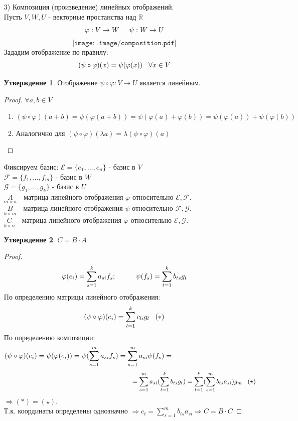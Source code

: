 \documentclass[a4paper, 12pt]{article}
\newcommand{\R}{\mathbb R}
\renewcommand{\phi}{\varphi}
\newcommand\tab[1][.5cm]{\hspace*{#1}}
\theoremstyle{definition}
\newtheorem*{subtheorem}{Утверждение}
\begin{document}
\begin{itemize}
\begin{proof}
    \end{proof} 
    \item[3)] Композиция (произведение) линейных отображений. \\
    Пусть $V, W, U$ - векторные простанства над $\R$
    $$\phi: V \to W \tab[0.5cm] \psi: W \to U$$
    $$\texttt{[image: .image/composition.pdf]}$$
    Зададим отображение по правилу: 
    $$(\psi \circ \phi)(x) = \psi(\phi(x)) \tab[0.3cm] \forall x \in V$$   
    \begin{subtheorem}
      Отображение $\psi \circ \phi: V \to U$ является линейным.
    \end{subtheorem} 
    \begin{proof}
      $\forall a, b \in V$
      \begin{enumerate}
        \item $(\psi \circ \phi)(a+b) = \psi(\phi(a+b)) = \psi(\phi(a)+\phi(b)) = \psi(\phi(a))+\psi(\phi(b))$ 
        \item Аналогично для $(\psi \circ \phi)(\lambda a) = \lambda(\psi \circ \phi)(a)$ 
      \end{enumerate}
    \end{proof} 

    Фиксируем базис: \tab[0.3cm]$\mathcal{E} = \{e_1,...,e_n\}$ - базис в $V$ \\
    \tab[4.3cm]$\mathcal{F} = \{f_1,...,f_m\}$ - базис в $W$ \\
    \tab[4.3cm]$\mathcal{G} = \{g_1,...,g_k\}$ - базис в $U$ \\
    $\underset{m \times n}{A}$ - матрица линейного отображения $\phi$ относительно $\mathcal{E}, \mathcal{F}$. \\
    $\underset{k \times m}{B}$ - матрица линейного отображения $\psi$ относительно $\mathcal{F}, \mathcal{G}$. \\
    $\underset{k \times n}{C}$ - матрица линейного отображения $\phi$ относительно $\mathcal{E}, \mathcal{G}$.
    \begin{subtheorem}
      $C = B \cdot A$ 
    \end{subtheorem} 
    \begin{proof}
      $$\phi(e_i) = \sum \limits_{s=1}^ka_{si}f_s; \tab[1cm]\psi(f_s) = \sum \limits_{t=1}^kb_{ts}g_t$$
      По определению матрицы линейного отображения:
      $$(\psi \circ \phi)(e_i) = \sum \limits_{l=1}^kc_{li}g_l \tab[0.3cm](\ast)$$ 
      По определению композиции:
      $$(\psi \circ \phi)(e_i) = \psi(\phi(e_i)) = \psi(\sum \limits_{s=1}^ma_{si}f_s) = \sum \limits_{s=1}^ma_{si}\psi(f_s) =\tab[4cm]$$ $$\tab[7cm]= \sum \limits_{s=1}^ma_{si}(\sum \limits_{t=1}^kb_{ts}g_t) = \sum \limits_{t=1}^k(\sum \limits_{s=1}^mb_{ts}a_{si})g_m \tab[0.3cm](\star)$$
      $\Longrightarrow $$(\ast) = (\star)$.\\
      Т.к. координаты определены однозначно $\Rightarrow c_t = \sum \limits_{s=1}^mb_{ts}a_{si} \Rightarrow C =B \cdot C$  
    \end{proof} 
  \end{itemize}
\end{document}
